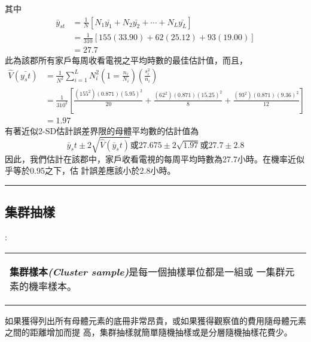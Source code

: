 \begin{ex}
\begin{table}[H]
\begin{tabular}{cccccc}
			\end{tabular}
		\end{table}
		其中
		\begin{equation}\begin{aligned}
		\bar{y}_{st}&=\frac{1}{N} [N_1 \bar{y_1}+N_2 \bar{y_2}+\cdots+N_L \bar{y_L}]\\
		&=\frac{1}{310}[155(33.90)+62(25.12)+93(19.00)] \\
		&=27.7 \end{aligned}
		\end{equation}
		此為該郡所有家戶每周收看電視之平均時數的最佳估計值，而且，
		\begin{equation}\begin{aligned}
		\hat{V}(\bar{y_st})&=\frac{1}{N^2} \sum^{L}_{i=1} N^2_i \left( 1=\frac{n_i}				{N_i} \right)\left( \frac{s^2_i}{n_i} \right)\\
		&= \frac{1}{310^2} \left[ \frac{(155^2)(0.871)(5.95)^2}{20}+ \frac{(62^2)				(0.871)(15.25)^2}{8}+ \frac{(93^2)(0.871)(9.36)^2}{12}  \right]\\
		&=1.97
		 \end{aligned}		 
		\end{equation}
		有著近似2-SD估計誤差界限的母體平均數的估計值為
		$$ \bar{y}_st \pm 2\sqrt{\hat{V}(\bar{y}_st)} \mbox{或} 27.675 \pm 							2\sqrt{1.97} \mbox{或} 27.7 \pm 2.8 $$
		因此，我們估計在該郡中，家戶收看電視的每周平均時數為27.7小時。在機率近似乎等於0.95之下，估			計誤差應該小於2.8小時。		
		\end{ex}		
		\rule{\textwidth}{0.2pt}
		\subsection{集群抽樣{}}:		
		\begin{center}\colorbox{slight}{
				\begin{tabular}{p{}}
					\begin{de}\label{de:cluster}
						\textbf{集群樣本\emph{(Cluster sample)}}是每一個抽樣單位都是一組或							一集群元素的機率樣本。						
					\end{de}
				\end{tabular}
			}
			\end{center}			
		
		如果獲得列出所有母體元素的底冊非常昂貴，或如果獲得觀察值的費用隨母體元素之間的距離增加而提			高，集群抽樣就簡單隨機抽樣或是分層隨機抽樣花費少。		
		
